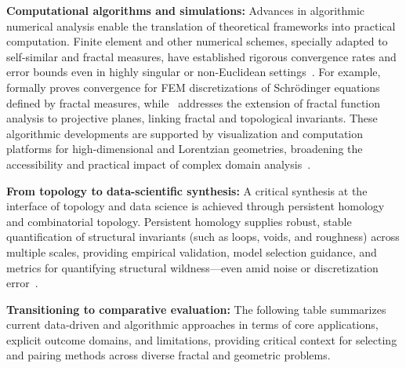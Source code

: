 \documentclass[sigconf]{acmart}
\begin{document}
\textbf{Computational algorithms and simulations:}
Advances in algorithmic numerical analysis enable the translation of theoretical frameworks into practical computation. Finite element and other numerical schemes, specially adapted to self-similar and fractal measures, have established rigorous convergence rates and error bounds even in highly singular or non-Euclidean settings~\cite{ref29,ref31,ref32,ref33,ref45}. For example, \cite{ref29} formally proves convergence for FEM discretizations of Schrödinger equations defined by fractal measures, while~\cite{ref33} addresses the extension of fractal function analysis to projective planes, linking fractal and topological invariants. These algorithmic developments are supported by visualization and computation platforms for high-dimensional and Lorentzian geometries, broadening the accessibility and practical impact of complex domain analysis~\cite{ref29,ref45,ref54}.

\textbf{From topology to data-scientific synthesis:}
A critical synthesis at the interface of topology and data science is achieved through persistent homology and combinatorial topology. Persistent homology supplies robust, stable quantification of structural invariants (such as loops, voids, and roughness) across multiple scales, providing empirical validation, model selection guidance, and metrics for quantifying structural wildness—even amid noise or discretization error~\cite{ref39}.

\textbf{Transitioning to comparative evaluation:} The following table summarizes current data-driven and algorithmic approaches in terms of core applications, explicit outcome domains, and limitations, providing critical context for selecting and pairing methods across diverse fractal and geometric problems.
\end{document}

